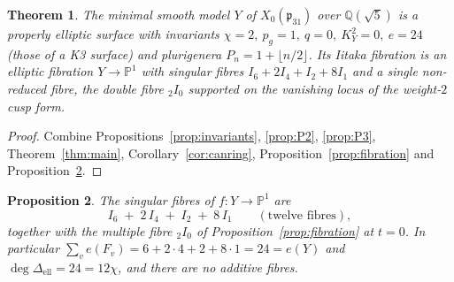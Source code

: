 \documentclass[11pt]{article}
\newtheorem{theorem}{Theorem}[section]
\newtheorem{proposition}[theorem]{Proposition}
\theoremstyle{definition}
\newcommand{\bP}{\mathbb{P}}
\newcommand{\bQ}{\mathbb{Q}}
\newcommand{\fp}{\mathfrak{p}}
\begin{document}
\begin{theorem}
The minimal smooth model $Y$ of $X_0(\fp_{31})$ over $\bQ(\sqrt5)$ is a
properly elliptic surface with invariants
$\chi=2,\ p_g=1,\ q=0,\ K_Y^2=0,\ e=24$ (those of a K3 surface) and
plurigenera $P_n=1+\lfloor n/2\rfloor$. Its Iitaka fibration is an elliptic
fibration $Y\to\bP^1$ with singular fibres $I_6+2I_4+I_2+8I_1$ and a single
non-reduced fibre, the double fibre ${}_2I_0$ supported on the vanishing locus
of the weight-$2$ cusp form.
\end{theorem}

\begin{proof}
Combine Propositions~\ref{prop:invariants}, \ref{prop:P2}, \ref{prop:P3},
Theorem~\ref{thm:main}, Corollary~\ref{cor:canring},
Proposition~\ref{prop:fibration} and Proposition~\ref{prop:fibres}.
\end{proof}

\begin{proposition}\label{prop:fibres}
The singular fibres of $f\colon Y\to\bP^1$ are
\[
   I_6 \;+\; 2\,I_4 \;+\; I_2 \;+\; 8\,I_1
   \qquad(\text{twelve fibres}),
\]
together with the multiple fibre ${}_2I_0$ of Proposition~\ref{prop:fibration}
at $t=0$. In particular
$\sum_v e(F_v)=6+2\cdot4+2+8\cdot1=24=e(Y)$ and
$\deg\Delta_{\mathrm{ell}}=24=12\chi$, and there are no additive fibres.
\end{proposition}
\end{document}
